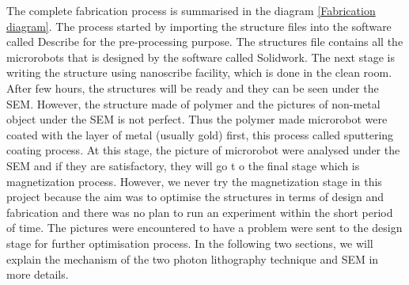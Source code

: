 \documentclass[12pt,a4paper,titlepage]{report}
\begin{document}
The complete fabrication process is summarised in the diagram \ref{Fabrication diagram}.
The process started by importing the structure files into the software called Describe for 
the pre-processing purpose. The structures file contains all the microrobots that is designed by the 
software called Solidwork. The next stage is writing the structure using nanoscribe facility, which is 
done in the clean room. After few hours, the structures will be ready and they can be seen under 
the \ac*{SEM}. However, the structure made of polymer and the pictures of non-metal object under 
the \ac*{SEM} is not perfect. Thus the polymer made microrobot were coated with the layer of 
metal (usually gold) first, this process called sputtering coating process.  At this stage, the 
picture of microrobot were analysed under the \ac*{SEM} and if they are satisfactory, they will go t
o the final stage which is magnetization process. However, we never try the magnetization stage 
in this project because the aim was to optimise the structures in terms of design and fabrication and 
there was no plan to run an experiment within the short period of time. The pictures were encountered 
to have a problem were sent to the design stage for further optimisation process. In the following 
two sections, we will explain the mechanism of the two photon lithography technique and \ac*{SEM} in
 more details.   




\end{document}
